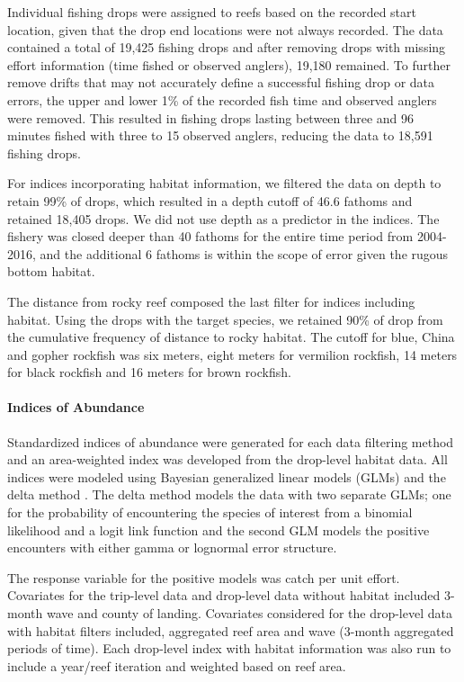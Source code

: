 \documentclass[
  authoryear,
  preprint,
  3p]{elsarticle}
\let\oldparagraph\paragraph
\renewcommand{\paragraph}[1]{\oldparagraph{#1}\mbox{}}
\begin{document}
Individual fishing drops were assigned to reefs based on the recorded
start location, given that the drop end locations were not always
recorded. The data contained a total of 19,425 fishing drops and after
removing drops with missing effort information (time fished or observed
anglers), 19,180 remained. To further remove drifts that may not
accurately define a successful fishing drop or data errors, the upper
and lower 1\% of the recorded fish time and observed anglers were
removed. This resulted in fishing drops lasting between three and 96
minutes fished with three to 15 observed anglers, reducing the data to
18,591 fishing drops.

For indices incorporating habitat information, we filtered the data on
depth to retain 99\% of drops, which resulted in a depth cutoff of 46.6
fathoms and retained 18,405 drops. We did not use depth as a predictor
in the indices. The fishery was closed deeper than 40 fathoms for the
entire time period from 2004-2016, and the additional 6 fathoms is
within the scope of error given the rugous bottom habitat.

The distance from rocky reef composed the last filter for indices
including habitat. Using the drops with the target species, we retained
90\% of drop from the cumulative frequency of distance to rocky habitat.
The cutoff for blue, China and gopher rockfish was six meters, eight
meters for vermilion rockfish, 14 meters for black rockfish and 16
meters for brown rockfish.

\hypertarget{indices-of-abundance}{%
\paragraph{Indices of Abundance}\label{indices-of-abundance}}

Standardized indices of abundance were generated for each data filtering
method and an area-weighted index was developed from the drop-level
habitat data. All indices were modeled using Bayesian generalized linear
models (GLMs) and the delta method \citep{Lo:1992:IRA}. The delta method
models the data with two separate GLMs; one for the probability of
encountering the species of interest from a binomial likelihood and a
logit link function and the second GLM models the positive encounters
with either gamma or lognormal error structure.

The response variable for the positive models was catch per unit effort.
Covariates for the trip-level data and drop-level data without habitat
included 3-month wave and county of landing. Covariates considered for
the drop-level data with habitat filters included, aggregated reef area
and wave (3-month aggregated periods of time). Each drop-level index
with habitat information was also run to include a year/reef iteration
and weighted based on reef area.
\end{document}
